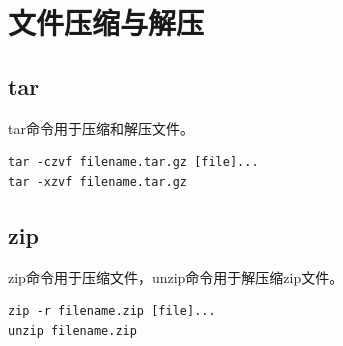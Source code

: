 \documentclass[12pt, openany, oneside]{book}
\begin{document}
\newpage

\section{文件压缩与解压}

\subsection{tar}

tar命令用于压缩和解压文件。

\vspace{-0.5cm}
\begin{lstlisting}
tar -czvf filename.tar.gz [file]...
tar -xzvf filename.tar.gz
\end{lstlisting}

\begin{table}[H]
	\centering
	\caption{tar参数说明}
\end{table}

\subsection{zip}

zip命令用于压缩文件，unzip命令用于解压缩zip文件。

\vspace{-0.5cm}
\begin{lstlisting}
zip -r filename.zip [file]...
unzip filename.zip
\end{lstlisting}
\end{document}
